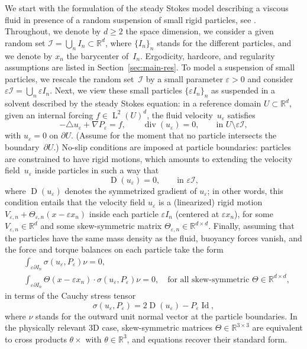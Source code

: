 \documentclass[10pt]{amsart}
\let\mathcal\mathscr
\newcounter{assumption}
\theoremstyle{plain}
\theoremstyle{definition}
\newcommand{\e}{\varepsilon}
\newcommand{\R}{\mathbb R}
\newcommand{\Ic}{\mathcal I}
\newcommand{\Id}{\operatorname{Id}}
\newcommand{\D}{\operatorname{D}}
\newcommand{\Ld}{\operatorname{L}}
\newcommand{\Div}{{\operatorname{div}}}
\begin{document}
We start with the formulation of the steady Stokes model describing a viscous fluid in presence of a random suspension of small rigid particles, see \eg \cite{DG-19}.
Throughout, we denote by $d\ge 2$ the space dimension, we consider a given random set $\Ic=\bigcup_nI_n\subset\R^d$, where $\{I_n\}_n$ stands for the different particles, and we denote by $x_n$ the barycenter of~$I_n$. Ergodicity, hardcore, and regularity assumptions are listed in Section~\ref{sec:main-res}.
To model a suspension of small particles, we rescale the random set~$\Ic$ by a small parameter $\e>0$ and consider $\e\Ic=\bigcup_n\e I_n$.
Next, we view these small particles $\{\e I_n\}_n$ as suspended in a solvent described by the steady Stokes equation: in a reference domain $U\subset\R^d$, given an internal forcing $f\in \Ld^2(U)^d$, the fluid velocity~$u_\e$ satisfies
\begin{equation}\label{e.intro1}
-\triangle u_\e+\nabla P_\e=f,\qquad\Div( u_\e)=0,\qquad\text{in $U\setminus\e\Ic$},
\end{equation}
with $u_\e=0$ on $\partial U$.
(Assume for the moment that no particle intersects the boundary~$\partial U$.)
No-slip conditions are imposed at particle boundaries: particles are constrained to have rigid motions, which amounts to extending the velocity field~$u_\e$ inside particles in such a way that
\begin{equation*}\label{e.intro+2}
\D(u_\e)=0,\qquad\text{in $\e\Ic$},
\end{equation*}
where $\D(u_\e)$ denotes the symmetrized gradient of $u_\e$; in other words, this condition entails that the velocity field $u_\e$ is a (linearized) rigid motion $V_{\e,n}+\Theta_{\e,n}(x-\e x_n)$ inside each particle $\e I_n$ (centered at $\e x_n$), for some $V_{\e,n}\in\R^d$ and some skew-symmetric matrix $\Theta_{\e,n}\in\R^{d\times d}$.
Finally, assuming that the particles have the same mass density as the fluid, buoyancy forces vanish, and
the force and torque balances on each particle take the form
\begin{align}
&\int_{\e\partial I_n}\sigma(u_\e,P_\e)\nu=0,\label{eq:force-bal}\\
&\int_{\e\partial I_n}\Theta(x-\e x_n)\cdot\sigma(u_\e,P_\e)\nu=0,\quad\text{for all skew-symmetric $\Theta\in\R^{d\times d}$},\label{e.intro+3}
\end{align}
in terms of the Cauchy stress tensor
\begin{equation}\label{eq:Cauchy}
\sigma(u_\e,P_\e)=2\D(u_\e)-P_\e\Id,
\end{equation}
where $\nu$ stands for the outward unit normal vector at the particle boundaries.
In the physically relevant 3D case, skew-symmetric matrices $\Theta\in\R^{3\times 3}$ are equivalent to cross products $\theta\times$ with $\theta\in\R^3$, and equations recover their standard form.
\end{document}
